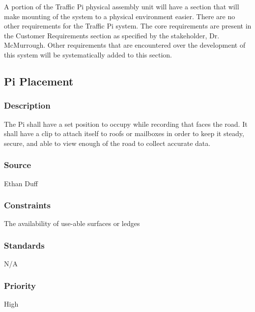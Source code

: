 A portion of the Traffic Pi physical assembly unit will have a section that will make mounting of the system to a physical environment easier. There are no other requirements for the Traffic Pi system. The core requirements are present in the Customer Requirements section as specified by the stakeholder, Dr. McMurrough. Other requirements that are encountered over the development of this system will be systematically added to this section.

\subsection{Pi Placement}
\subsubsection{Description}
The Pi shall have a set position to occupy while recording that faces the road.  It shall have a clip to attach itself to roofs or mailboxes in order to keep it steady, secure, and able to view enough of the road to collect accurate data.
\subsubsection{Source}
Ethan Duff
\subsubsection{Constraints}
The availability of use-able surfaces or ledges
\subsubsection{Standards}
N/A
\subsubsection{Priority}
High